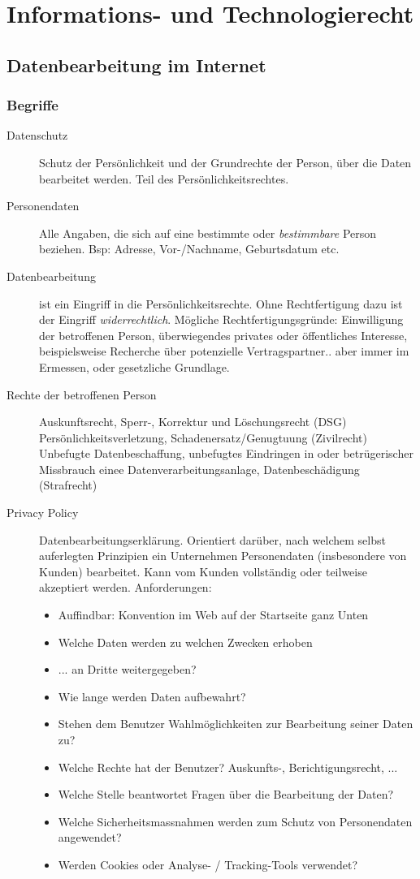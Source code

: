 \chapter{Informations- und Technologierecht}

\section{Datenbearbeitung im Internet}
\subsection{Begriffe}
\begin{description}
  \item[Datenschutz] Schutz der Persönlichkeit und der Grundrechte der Person, über die Daten bearbeitet werden. Teil des Persönlichkeitsrechtes.
  \item[Personendaten] Alle Angaben, die sich auf eine bestimmte oder \textit{bestimmbare} Person beziehen. Bsp: Adresse, Vor-/Nachname, Geburtsdatum etc.  
  \item[Datenbearbeitung] ist ein Eingriff in die Persönlichkeitsrechte. Ohne Rechtfertigung dazu ist der Eingriff \textit{widerrechtlich}. Mögliche Rechtfertigungsgründe: Einwilligung der betroffenen Person, überwiegendes privates oder öffentliches Interesse, beispielsweise Recherche über potenzielle Vertragspartner.. aber immer im Ermessen, oder gesetzliche Grundlage.
  \item[Rechte der betroffenen Person] Auskunftsrecht, Sperr-, Korrektur und Löschungsrecht (DSG) Persönlichkeitsverletzung, Schadenersatz/Genugtuung (Zivilrecht) Unbefugte Datenbeschaffung, unbefugtes Eindringen in oder betrügerischer Missbrauch einee Datenverarbeitungsanlage, Datenbeschädigung (Strafrecht)
  \item[Privacy Policy] Datenbearbeitungserklärung. Orientiert darüber, nach welchem selbst auferlegten Prinzipien ein Unternehmen Personendaten (insbesondere von Kunden) bearbeitet. Kann vom Kunden vollständig oder teilweise akzeptiert werden. Anforderungen:
    \begin{itemize}
      \item Auffindbar: Konvention im Web auf der Startseite ganz Unten
      \item Welche Daten werden zu welchen Zwecken erhoben
      \item ... an Dritte weitergegeben?
      \item Wie lange werden Daten aufbewahrt?
      \item Stehen dem Benutzer Wahlmöglichkeiten zur Bearbeitung seiner Daten zu?
      \item Welche Rechte hat der Benutzer? Auskunfts-, Berichtigungsrecht, ...
      \item Welche Stelle beantwortet Fragen über die Bearbeitung der Daten?
      \item Welche Sicherheitsmassnahmen werden zum Schutz von Personendaten angewendet?
      \item Werden Cookies oder Analyse- / Tracking-Tools verwendet?
    \end{itemize}
\end{description}

